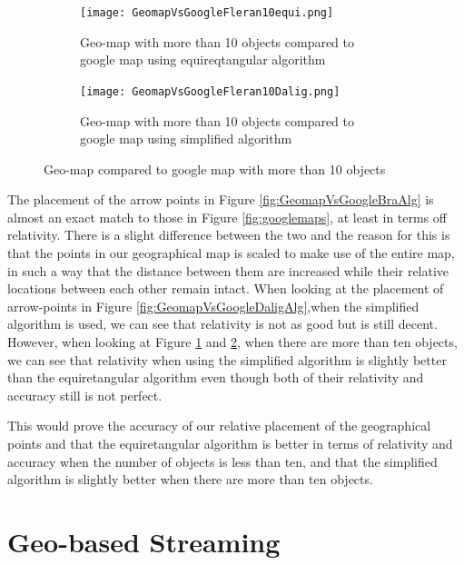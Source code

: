 \begin{figure}
\begin{subfigure}[b]{0.5\textwidth}
       \texttt{[image: GeomapVsGoogleFleran10equi.png]}
		\caption{Geo-map with more than 10 objects compared to google map using equireqtangular algorithm}
  	\label{fig:GeomapVsGoogleFleran10equi}
    \end{subfigure}\hfill 
    \hspace{3px}
    \begin{subfigure}[b]{0.5\textwidth}
       \texttt{[image: GeomapVsGoogleFleran10Dalig.png]}
  \caption{Geo-map with more than 10 objects compared to google map using simplified algorithm}	\label{fig:GeomapVsGoogleFleran10Dalig}
    \end{subfigure}
	\caption{Geo-map compared to google map with more than 10 objects}
	\label{fig:GeomapVsGoogleWithMoreThan10objects}
\end{figure}

The placement of the arrow points in Figure \ref{fig:GeomapVsGoogleBraAlg} is almost an exact match to those in Figure \ref{fig:googlemaps}, at least in terms off relativity. There is a slight difference between the two and the reason for this is that the points in our geographical map is scaled to make use of the entire map, in such a way that the distance between them are increased while their relative locations between each other remain intact. When looking at the placement of arrow-points in Figure \ref{fig:GeomapVsGoogleDaligAlg},when the simplified algorithm is used, we can see that relativity is not as good but is still decent. However, when looking at Figure \ref{fig:GeomapVsGoogleFleran10equi} and \ref{fig:GeomapVsGoogleFleran10Dalig}, when there are more than ten objects, we can see that relativity when using the simplified algorithm is slightly better than the equiretangular algorithm even though both of their relativity and accuracy still is not perfect. 

This would prove the accuracy of our relative placement of the geographical points and that the equiretangular algorithm is better in terms of relativity and accuracy when the number of objects is less than ten, and that the simplified algorithm is slightly better when there are more than ten objects.

\section{Geo-based Streaming}
\label{sec:geobasedstreaming}

